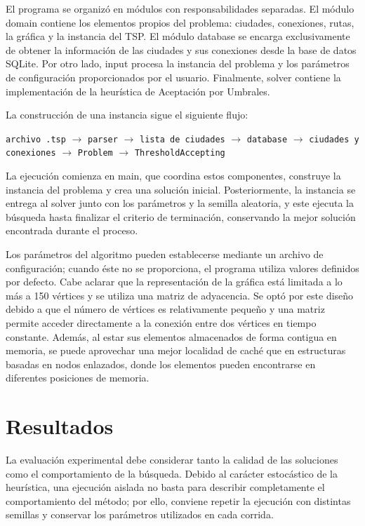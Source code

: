 \documentclass[11pt,a4paper]{article}
\begin{document}
El programa se organizó en módulos con responsabilidades separadas. El
módulo domain contiene los elementos propios del problema:
ciudades, conexiones, rutas, la gráfica y la instancia del TSP. El
módulo database se encarga exclusivamente de obtener la
información de las ciudades y sus conexiones desde la base de datos
SQLite. Por otro lado, input procesa la instancia del
problema y los parámetros de configuración proporcionados por el
usuario. Finalmente, solver contiene la implementación de la
heurística de Aceptación por Umbrales.

La construcción de una instancia sigue el siguiente flujo:

\begin{center}
\texttt{archivo .tsp} $\rightarrow$ \texttt{parser} $\rightarrow$
\texttt{lista de ciudades} $\rightarrow$ \texttt{database}
$\rightarrow$ \texttt{ciudades y conexiones} $\rightarrow$
\texttt{Problem} $\rightarrow$ \texttt{ThresholdAccepting}
\end{center}

La ejecución comienza en main, que coordina estos
componentes, construye la instancia del problema y crea una solución
inicial. Posteriormente, la instancia se entrega al solver
junto con los parámetros y la semilla aleatoria, y este ejecuta la
búsqueda hasta finalizar el criterio de terminación, conservando la
mejor solución encontrada durante el proceso.

Los parámetros del algoritmo pueden establecerse mediante un archivo
de configuración; cuando éste no se proporciona, el programa utiliza
valores definidos por defecto. Cabe aclarar que la representación de
la gráfica está limitada a lo más a 150 vértices y se utiliza una
matriz de adyacencia. Se optó por este diseño debido a que el número
de vértices es relativamente pequeño y una matriz permite acceder
directamente a la conexión entre dos vértices en tiempo
constante. Además, al estar sus elementos almacenados de forma
contigua en memoria, se puede aprovechar una mejor localidad de caché
que en estructuras basadas en nodos enlazados, donde los elementos
pueden encontrarse en diferentes posiciones de memoria.



\section{Resultados}

La evaluación experimental debe considerar tanto la calidad de las
soluciones como el comportamiento de la búsqueda. Debido al carácter
estocástico de la heurística, una ejecución aislada no basta para
describir completamente el comportamiento del método; por ello,
conviene repetir la ejecución con distintas semillas y conservar los
parámetros utilizados en cada corrida.
\end{document}
